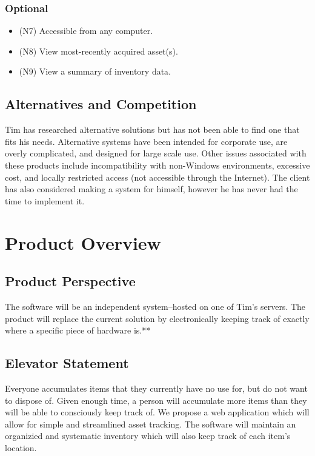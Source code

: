 \documentclass{article}
\begin{document}
\subsubsection{Optional}
\begin{itemize}
\item (N7) Accessible from any computer.
\item (N8) View most-recently acquired asset(s).
\item (N9) View a summary of inventory data.
\end{itemize}


\subsection{Alternatives and Competition}
Tim has researched alternative solutions but has not been able to find one that fits his needs.  Alternative systems have been intended for corporate use, are overly complicated, and designed for large scale use.  Other issues associated with these products include incompatibility with non-Windows environments, excessive cost, and locally restricted access (not accessible through the Internet).  The client has also considered making a system for himself, however he has never had the time to implement it.

\section{Product Overview}

\subsection{Product Perspective}
The software will be an independent system--hosted on one of Tim's servers.  The product will replace the current solution by electronically keeping track of exactly where a specific piece of hardware is.**

\subsection{Elevator Statement}
Everyone accumulates items that they currently have no use for, but do not want to dispose of.  Given enough time, a person will accumulate more items than they will be able to consciously keep track of. We propose a web application which will allow for simple and streamlined asset tracking. The software will maintain an organizied and systematic inventory which will also keep track of each item's location.
\end{document}

